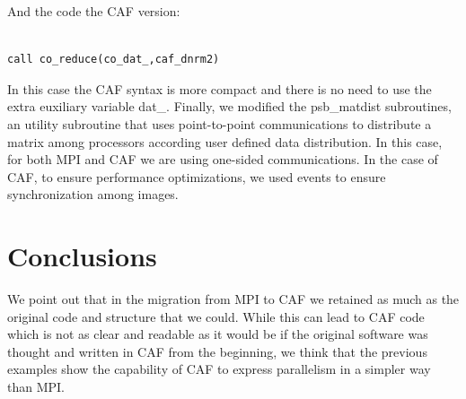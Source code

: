 \documentclass{IOS-Book-Article}
\begin{document}
And the code the CAF version: 

\begin{center}
{\small
\begin{lstlisting}

call co_reduce(co_dat_,caf_dnrm2)

\end{lstlisting}}
\end{center}
In this case the CAF syntax is more compact and there is no need to use the extra euxiliary variable dat\_.
Finally, we modified the psb\_matdist subroutines, an utility subroutine that uses point-to-point communications to distribute a matrix among processors according user defined data distribution. In this case, for both MPI and CAF we are using one-sided communications. In the case of CAF, to ensure performance optimizations, we used events to ensure synchronization among images. 

\section{Conclusions}

We point out that in the migration from MPI to CAF we retained as much as the original code and structure that we could. While this can lead to CAF code which is not as clear and readable as it would be if the original software was thought and written in CAF from the beginning, we think that the previous examples show the capability of CAF to express parallelism in a simpler way than MPI.  
 


\end{document}

